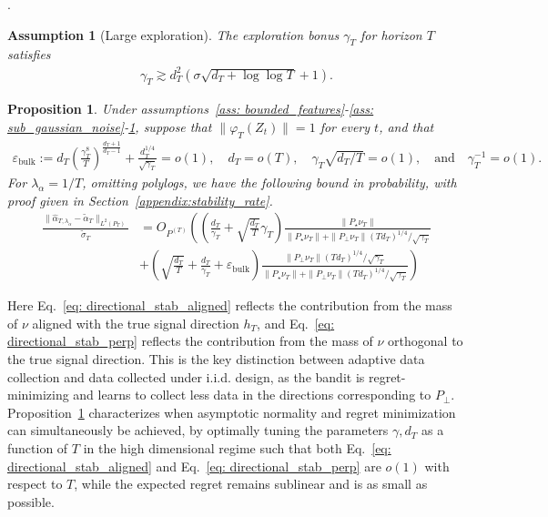 \documentclass[11pt]{article}
\newtheorem{prop}{Proposition}
\newtheorem{assum}{Assumption}
\begin{document}
\citep{fan2025statisticalinferenceadaptivesampling}. 
\begin{assum}[Large exploration]
\label{ass: large_exploration}
    The exploration bonus $\gamma_T$ for horizon $T$ 
satisfies
\begin{align*}
    \gamma_T \gtrsim d_T^2 (\sigma\sqrt{d_T + \log\log T} + 1). 
\end{align*}
\end{assum}
\begin{prop}\label{prop:linucb_stab} Under assumptions~\ref{ass: bounded_features}-\ref{ass: sub_gaussian_noise}-\ref{ass: large_exploration}, suppose that $\|\varphi_T(Z_t)\| = 1$ for every $t$, and  that
\begin{align*}
\varepsilon_{\mathrm{bulk}} := d_T \left( \frac{\gamma_T^8}{T} \right)^{\frac{d_T+1}{d_T-1}} + \frac{d_T^{1/4}}{\sqrt{\gamma_T}} = o(1), \quad d_T= o(T), \quad \gamma_T \sqrt{d_T / T} = o(1), \quad \text{and} \quad \gamma_T^{-1} = o(1).
\end{align*}
For $\lambda_\alpha = 1/T$, omitting polylogs, we have the following bound in probability, with proof given in Section~\ref{appendix:stability_rate}. 
    \begin{align}
\frac{\| \widehat \alpha_{T, \lambda_\alpha} - \widetilde \alpha_T \|_{L^2(P_T)}}{ \widetilde \sigma_T} &= O_{P^{(T)}} \left( \left(\frac{d_T}{\gamma_T} + \sqrt{\frac{d_T}{T}} \gamma_T \right)  \frac{\| P_\star \nu_T\|}{\| P_\star \nu_T\| + \|P_{\perp} \nu_T \| (T d_T)^{1/4} / \sqrt{\gamma_T} } \tag{$\parallel$}\label{eq: directional_stab_aligned} \right.\\
&\left.+ \left( \sqrt{\frac{d_T}{T}} + \frac{d_T}{\gamma_T} + \varepsilon_{\mathrm{bulk}} \right)\frac{\|P_{\perp} \nu_T \| (T d_T)^{1/4} / \sqrt{\gamma_T} }{\| P_\star \nu_T\| + \|P_{\perp} \nu_T \| (T d_T)^{1/4} / \sqrt{\gamma_T} } \tag{$\perp$} \right)\label{eq: directional_stab_perp}
\end{align}
\end{prop}
Here Eq.~\eqref{eq: directional_stab_aligned} reflects the contribution from the mass of $\nu$ aligned with the true signal direction $h_T$, and Eq.~\eqref{eq: directional_stab_perp} reflects the contribution from the mass of $\nu$ orthogonal to the true signal direction. This is the key distinction between adaptive data collection and data collected under i.i.d. design, as the bandit is regret-minimizing and learns to collect less data in the directions corresponding to $P_{\perp}$. Proposition~\ref{prop:linucb_stab} characterizes when asymptotic normality and regret minimization can  simultaneously be achieved, by optimally tuning the parameters $\gamma, d_T$ as a function of $T$ in the high dimensional regime such that both Eq.~\eqref{eq: directional_stab_aligned} and Eq.~\eqref{eq: directional_stab_perp} are $o(1)$ with respect to $T$, while the expected regret remains sublinear and is as small as possible. 
\end{document}
